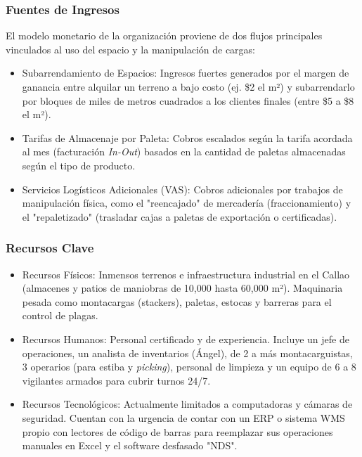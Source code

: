 \documentclass[11pt]{article}
\begin{document}
\subsubsection{Fuentes de Ingresos} El modelo monetario de la
organización proviene de dos flujos principales vinculados al uso del
espacio y la manipulación de cargas:

\begin{itemize}
\item
  Subarrendamiento de Espacios: Ingresos fuertes generados por el margen
  de ganancia entre alquilar un terreno a bajo costo (ej. \$2 el m²) y
  subarrendarlo por bloques de miles de metros cuadrados a los clientes
  finales (entre \$5 a \$8 el m²).
\item
  Tarifas de Almacenaje por Paleta: Cobros escalados según la tarifa
  acordada al mes (facturación \emph{In-Out}) basados en la cantidad de
  paletas almacenadas según el tipo de producto.
\item
  Servicios Logísticos Adicionales (VAS): Cobros adicionales por
  trabajos de manipulación física, como el "reencajado" de mercadería
  (fraccionamiento) y el "repaletizado" (trasladar cajas a paletas de
  exportación o certificadas).
\end{itemize}

\subsubsection{Recursos Clave}

\begin{itemize}
\item
  Recursos Físicos: Inmensos terrenos e infraestructura industrial en el
  Callao (almacenes y patios de maniobras de 10,000 hasta 60,000 m²).
  Maquinaria pesada como montacargas (stackers), paletas, estocas y
  barreras para el control de plagas.
\item
  Recursos Humanos: Personal certificado y de experiencia. Incluye un
  jefe de operaciones, un analista de inventarios (Ángel), de 2 a más
  montacarguistas, 3 operarios (para estiba y \emph{picking}), personal
  de limpieza y un equipo de 6 a 8 vigilantes armados para cubrir turnos
  24/7.
\item
  Recursos Tecnológicos: Actualmente limitados a computadoras y cámaras
  de seguridad. Cuentan con la urgencia de contar con un ERP o sistema
  WMS propio con lectores de código de barras para reemplazar sus
  operaciones manuales en Excel y el software desfasado "NDS".
\end{itemize}
\end{document}
